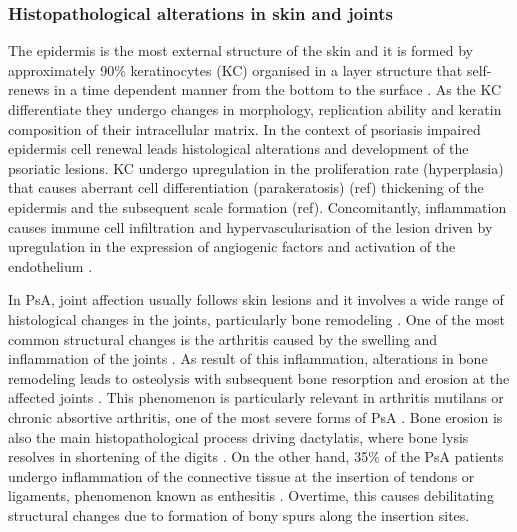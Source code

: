 

\subsubsection{Histopathological alterations in skin and joints}

The epidermis is the most external structure of the skin and it is formed by approximately 90\% keratinocytes (KC) organised in a layer structure that self-renews in a time dependent manner from the bottom to the surface \parencite{Wikramanayake2014}. As the KC differentiate they undergo changes in morphology, replication ability and keratin composition of their intracellular matrix. In the context of psoriasis impaired epidermis cell renewal leads histological alterations and development of the psoriatic lesions. KC undergo upregulation in the proliferation rate (hyperplasia) that causes aberrant cell differentiation (parakeratosis) (ref) thickening of the epidermis and the subsequent scale formation (ref). Concomitantly, inflammation causes immune cell infiltration and hypervascularisation of the lesion driven by upregulation in the expression of angiogenic factors and activation of the endothelium \parencite{Perera2012}. 

In PsA, joint affection usually follows skin lesions and it involves a wide range of histological changes in the joints, particularly bone remodeling \parencite{Haddad2013}. One of the most common structural changes is the arthritis caused by the swelling and inflammation of the joints \parencite{Schett2011}. As result of this inflammation, alterations in bone remodeling leads to osteolysis with subsequent bone resorption and erosion at the affected joints \parencite{Mensah2017}. This phenomenon is particularly relevant in arthritis mutilans or chronic absortive arthritis, one of the most severe forms of PsA \parencite{Haddad2013}. Bone erosion is also the main histopathological process driving dactylatis, where bone lysis resolves in shortening of the digits \parencite{Gladman2005}. On the other hand, 35\% of the PsA patients undergo inflammation of the connective tissue at the insertion of tendons or ligaments, phenomenon known as enthesitis \parencite{McGonagle2011,Polachek2017}. Overtime, this causes debilitating structural changes due to formation of bony spurs along the insertion sites\parencite{Schett2011}.


